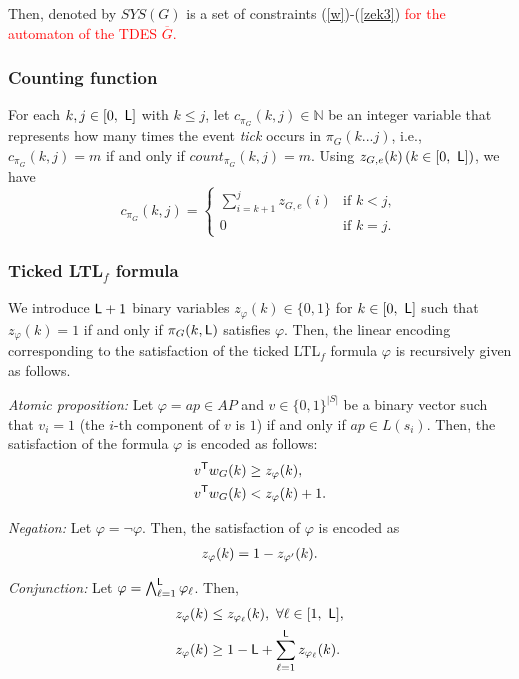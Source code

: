 \documentclass{article}
\newcommand{\Len}{{\sf L}}
\newcommand{\red}[1]{\textcolor{red}{#1}}
\begin{document}
Then, denoted by $SYS(G)$ is a set of constraints (\ref{w})-(\ref{zek3}) \red{for the automaton of the TDES $\overline{G}$.}


\subsubsection{Counting function}
For each $k, j \in [0,\ \Len]$ with $k\leq j$, let $c_{\pi_G} (k, j) \in \mathbb{N}$ be an integer variable that represents how many times the event \textit{tick} occurs in $\pi_G(k...j)$, i.e., $c_{\pi_G}(k,j) = m$ if and only if $count_{\pi_G}(k,j) = m$. 
Using $z_{G,e} (k)\, (k \in [0,\ \Len])$, we have
\begin{equation}\label{ckj}
c_{\pi_G} (k, j) = \left\{ \begin{array}{ll}
\displaystyle{\sum^j _{i = k+1} z_{G,e} (i)} & \mbox{if } k<j , \\
0 & \mbox{if } k=j.
\end{array} \right. 
\end{equation}



%
\subsubsection{Ticked LTL$_f$ formula}\label{encLTL}
%   
We introduce $\Len+1$ binary variables $z_{\varphi}(k) \in \{0,1\}$ for $k \in [0,\ \Len]$ such that $z_{\varphi}(k)=1$ if and only if $\pi_G (k, \Len)$ satisfies $\varphi$.
Then, the linear encoding corresponding to the satisfaction of  the ticked LTL$_f$ formula $\varphi$ is recursively given as follows.
%
%

\textit{Atomic proposition:} Let $\varphi = ap \in AP$ and $v \in \{0, 1\}^{|S|}$ be a binary vector such that $v_i = 1$ (the $i$-th component of $v$ is $1$) if and only if $ap \in L(s_i)$. Then, the satisfaction of the formula $\varphi$ is encoded as follows: 
\begin{align}
v^\mathsf{T} {w_G}(k) &\geq z_\varphi (k),\notag\\
v^\mathsf{T} {w_G}(k) &< z_\varphi (k)+1. \notag
\end{align}

\textit{Negation:} Let $\varphi = \neg \varphi$. Then, the satisfaction of $\varphi$ is encoded as 
\begin{align}\notag
z_\varphi (k) = 1 - z_{\varphi'} (k). 
\end{align}

\textit{Conjunction:} Let $\varphi = \bigwedge^{\Len} _{\ell=1} \varphi_\ell$. Then, 
\begin{align}
\label{translate_con}
z_\varphi (k) &\leq z_{\varphi_\ell} (k),\ \forall \ell \in [1,\ \Len], \notag \\ 
z_\varphi (k) & \geq 1-\Len + \sum_{\ell=1}^{\Len} z_{\varphi_\ell} (k). \notag
\end{align}
\end{document}
